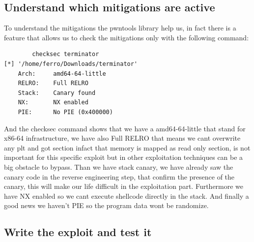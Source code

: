 \documentclass{report}
\begin{document}
    \subsection{Understand which mitigations are active}
To understand the mitigations the pwntools library help us, in fact there is a feature that allows us to check the mitigations only with the following command:
    \begin{verbatim}
        checksec terminator                                     
[*] '/home/ferro/Downloads/terminator'
    Arch:     amd64-64-little
    RELRO:    Full RELRO
    Stack:    Canary found
    NX:       NX enabled
    PIE:      No PIE (0x400000)
    \end{verbatim}
    And the checksec command shows that we have a amd64-64-little that stand for x86-64 infrastructure, we have also Full RELRO that means we cant overwrite any plt and got section infact that memory is mapped as read only section, is not important for this specific exploit but in other exploitation techniques can be a big obstacle to bypass.\newline
    Than we have stack canary, we have already saw the canary code in the reverse engineering step, that confirm the presence of the canary, this will make our life difficult in the exploitation part.\newline
    Furthermore we have NX enabled so we cant execute shellcode directly in the stack.\newline
    And finally a good news we haven't PIE so the program data wont be randomize.\newline
    \subsection{Write the exploit and test it}
\end{document}
